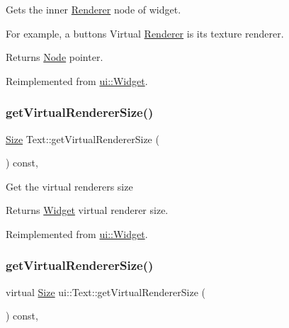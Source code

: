 Gets the inner \hyperlink{classRenderer}{Renderer} node of widget.

For example, a button\textquotesingle{}s Virtual \hyperlink{classRenderer}{Renderer} is it\textquotesingle{}s texture renderer.

\begin{DoxyReturn}{Returns}
\hyperlink{classNode}{Node} pointer. 
\end{DoxyReturn}


Reimplemented from \hyperlink{classui_1_1Widget_acf862bf9235fbb3823819eeb65d46f25}{ui\+::\+Widget}.

\mbox{\label{classui_1_1Text_aabb0e1e54bad95f923c6b8206bf18b5a}} 
\subsubsection{\texorpdfstring{get\+Virtual\+Renderer\+Size()}{getVirtualRendererSize()}\hspace{0.1cm}{\footnotesize\ttfamily [1/2]}}
{\footnotesize\ttfamily \hyperlink{classSize}{Size} Text\+::get\+Virtual\+Renderer\+Size (\begin{DoxyParamCaption}{ }\end{DoxyParamCaption}) const\hspace{0.3cm}{\ttfamily [override]}, {\ttfamily [virtual]}}

Get the virtual renderer\textquotesingle{}s size \begin{DoxyReturn}{Returns}
\hyperlink{classui_1_1Widget}{Widget} virtual renderer size. 
\end{DoxyReturn}


Reimplemented from \hyperlink{classui_1_1Widget_a2ed0d41565593f78dc59c975d58a869e}{ui\+::\+Widget}.

\mbox{\label{classui_1_1Text_a1a610c3ab53ff659e0f1b9071245bbc1}} 
\subsubsection{\texorpdfstring{get\+Virtual\+Renderer\+Size()}{getVirtualRendererSize()}\hspace{0.1cm}{\footnotesize\ttfamily [2/2]}}
{\footnotesize\ttfamily virtual \hyperlink{classSize}{Size} ui\+::\+Text\+::get\+Virtual\+Renderer\+Size (\begin{DoxyParamCaption}{ }\end{DoxyParamCaption}) const\hspace{0.3cm}{\ttfamily [override]}, {\ttfamily [virtual]}}

